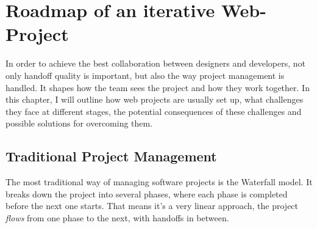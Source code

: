 \newpage
\section{Roadmap of an iterative Web-Project} %
In order to achieve the best collaboration between designers and developers, not only handoff
quality is important, but also the way project management is handled. It shapes how the team sees
the project and how they work together. In this chapter, I will outline how web projects are usually
set up, what challenges they face at different stages, the potential consequences of these
challenges and possible solutions for overcoming them.

\subsection{Traditional Project Management}
The most traditional way of managing software projects is the Waterfall model. It breaks down the
project into several phases, where each phase is completed before the next one starts. That means
it's a very linear approach, the project \textit{flows} from one phase to the next, with handoffs in
between. 


